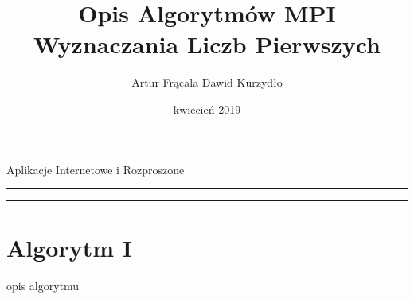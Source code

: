 \documentclass[a4paper,11pt]{article}
\title{Opis Algorytmów MPI Wyznaczania Liczb Pierwszych}
\author{Artur Frącala
        Dawid Kurzydło}
\date{kwiecień 2019}
\begin{document}
  \begin{center}\Large
Aplikacje Internetowe i Rozproszone
\end{center}
  \hrule
  {\let\newpage\relax\maketitle}
  \hrule


  \section{Algorytm I}
    opis algorytmu
\end{document}
